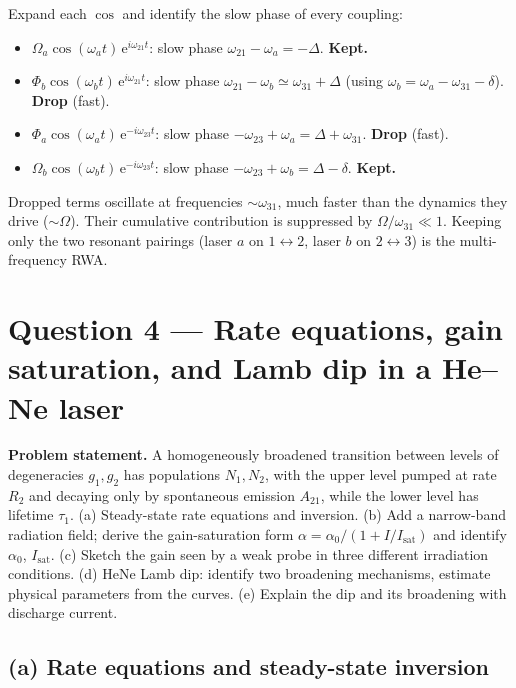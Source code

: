\documentclass[11pt]{article}
\begin{document}
Expand each $\cos$ and identify the slow phase of every coupling:
\begin{itemize}
\item $\Omega_{a}\cos(\omega_{a}t)\,\mathrm{e}^{i\omega_{21}t}$: slow phase $\omega_{21}-\omega_{a}=-\Delta$. \textbf{Kept.}
\item $\Phi_{b}\cos(\omega_{b}t)\,\mathrm{e}^{i\omega_{21}t}$: slow phase $\omega_{21}-\omega_{b}\simeq \omega_{31}+\Delta$ (using $\omega_{b}=\omega_{a}-\omega_{31}-\delta$). \textbf{Drop} (fast).
\item $\Phi_{a}\cos(\omega_{a}t)\,\mathrm{e}^{-i\omega_{23}t}$: slow phase $-\omega_{23}+\omega_{a}=\Delta+\omega_{31}$. \textbf{Drop} (fast).
\item $\Omega_{b}\cos(\omega_{b}t)\,\mathrm{e}^{-i\omega_{23}t}$: slow phase $-\omega_{23}+\omega_{b}=\Delta-\delta$. \textbf{Kept.}
\end{itemize}
Dropped terms oscillate at frequencies $\sim\omega_{31}$, much faster than the dynamics they drive ($\sim\Omega$). Their cumulative contribution is suppressed by $\Omega/\omega_{31}\ll 1$. Keeping only the two resonant pairings (laser $a$ on $1\!\leftrightarrow\!2$, laser $b$ on $2\!\leftrightarrow\!3$) is the multi-frequency RWA.

\section*{Question 4 --- Rate equations, gain saturation, and Lamb dip in a He--Ne laser}

\textbf{Problem statement.} A homogeneously broadened transition between levels of degeneracies $g_{1},g_{2}$ has populations $N_{1},N_{2}$, with the upper level pumped at rate $R_{2}$ and decaying only by spontaneous emission $A_{21}$, while the lower level has lifetime $\tau_{1}$. (a) Steady-state rate equations and inversion. (b) Add a narrow-band radiation field; derive the gain-saturation form $\alpha=\alpha_{0}/(1+I/I_{\mathrm{sat}})$ and identify $\alpha_{0}$, $I_{\mathrm{sat}}$. (c) Sketch the gain seen by a weak probe in three different irradiation conditions. (d) HeNe Lamb dip: identify two broadening mechanisms, estimate physical parameters from the curves. (e) Explain the dip and its broadening with discharge current.

\subsection*{(a) Rate equations and steady-state inversion}
\end{document}
